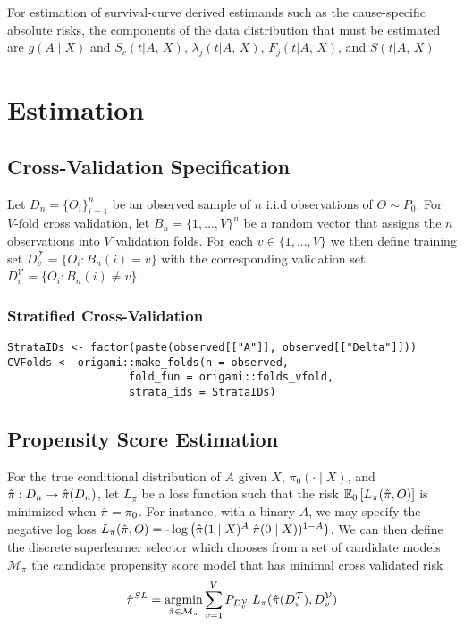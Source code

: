 \documentclass{report}
\newcommand{\1}{\ensuremath{\mathbf{1}}}
\DeclareMathOperator*{\argmin}{argmin}
\newcommand{\X}{\ensuremath{{X}}}
\newcommand{\AX}{\ensuremath{\mid A,\,{X}}}
\begin{document}
For estimation of survival-curve derived estimands such as the cause-specific absolute risks, the components of the data distribution that must be estimated are \(g(A \mid \X)\) and \(S_c(t \AX)\), \(\lambda_j(t \AX)\), \(F_j(t \AX)\), and \(S(t \AX)\)

\section*{Estimation}
\label{sec:org297e51f}
\subsection*{Cross-Validation Specification}
\label{sec:orgdbd96c1}
Let \(D_n = \{O_i\}_{i=1}^n\) be an observed sample of \(n\) i.i.d observations of \(O \sim P_0\). For \(V\text{-fold}\) cross validation, let \(B_n = \{1, ... , V\}^n\) be a random vector that assigns the \(n\) observations into \(V\) validation folds. For each \(v \in \{1, ..., V\}\) we then define training set \(D^\mathcal{T}_v = \{O_i : B_n(i) = v\}\) with the corresponding validation set \(D^\mathcal{V}_v = \{O_i : B_n(i) \neq v\}\).

\subsubsection*{Stratified Cross-Validation}
\label{sec:org9b4bf4d}
\begin{lstlisting}
StrataIDs <- factor(paste(observed[["A"]], observed[["Delta"]]))
CVFolds <- origami::make_folds(n = observed,
			       fold_fun = origami::folds_vfold,
			       strata_ids = StrataIDs)
\end{lstlisting}

\subsection*{Propensity Score Estimation}
\label{sec:orgbc93f3e}
For the true conditional distribution of \(A\) given \(\X\), \(\pi_0(\cdot \mid \X)\), and \(\Hat{\pi} : D_n \to \Hat{\pi}(D_n)\), let \(L_\pi\) be a loss function such that the risk \(\mathbb{E}_0\left[L_\pi(\Hat{\pi}, O)\right]\) is minimized when \(\Hat{\pi} = \pi_0\). For instance, with a binary \(A\), we may specify the negative log loss \(L_\pi(\Hat{\pi}, O) = \text{-}\log\left(\Hat{\pi}(1 \mid \X)^A \; \Hat{\pi}(0 \mid \X))^{1-A}\right)\). We can then define the discrete superlearner selector which chooses from a set of candidate models \(\mathcal{M_\pi}\) the candidate propensity score model that has minimal cross validated risk 
\[ \Hat{\pi}^{SL} = \argmin_{\Hat{\pi} \in \mathcal{M}_\pi} \sum_{v = 1}^{V} P_{D^\mathcal{V}_v} \; L_\pi(\Hat{\pi}(D^\mathcal{T}_v), D^\mathcal{V}_v)\]
\end{document}
